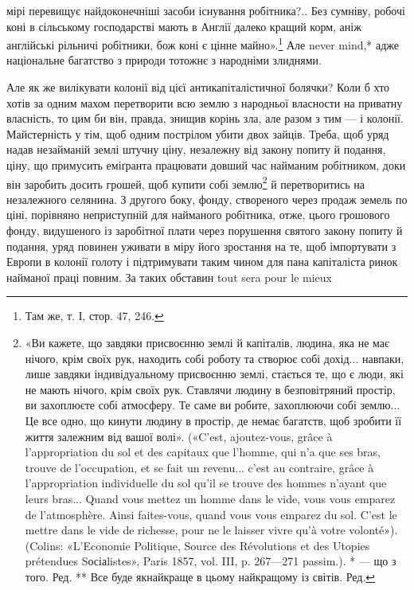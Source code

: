 \parcont{}  %
мірі перевищує найдоконечніші засоби існування робітника?.. Без сумніву, робочі коні в сільському
господарстві мають в Англії далеко кращий корм, аніж англійські рільничі робітники, бож коні є цінне
майно».\footnote{
Там же, т. І, стор. 47, 246.
} Але never mind,* адже національне багатство з природи тотожнє з народніми злиднями.

Але як же вилікувати колонії від цієї антикапіталістичної болячки? Коли б хто хотів за одним махом
перетворити всю землю з народньої власности на приватну власність, то цим би він, правда, знищив
корінь зла, але разом з тим — і колонії. Майстерність у тім, щоб одним пострілом убити двох зайців.
Треба, щоб уряд надав незайманій землі штучну ціну, незалежну від закону попиту й подання, ціну, що
примусить еміґранта
працювати довший час найманим робітником, доки він заробить досить грошей, щоб купити собі землю\footnote{
«Ви кажете, що завдяки присвоєнню землі й капіталів, людина, яка не має нічого, крім своїх рук,
находить собі роботу та створює собі дохід... навпаки, лише завдяки індивідуальному присвоєнню
землі, стається те, що є люди, які не мають нічого, крім своїх рук. Ставлячи людину в безповітряний
простір, ви захоплюєте собі атмосферу. Те саме ви робите, захоплюючи собі землю... Це все одно, що
кинути людину в простір, де немає багатств, щоб зробити її життя залежним від вашої волі». («C’est,
ajoutez-vous, grâce à l’appropriation du sol et des capitaux que l’homme, qui n’a que ses bras,
trouve de l’occupation, et se fait un revenu... c’est au contraire, grâce à l’appropriation
individuelle du
sol qu’il se trouve des hommes n’ayant que leurs bras... Quand vous mettez un homme dans le vide,
vous vous emparez de l’atmosphère. Ainsi faites-vous, quand vous vous emparez du sol. C’est le
mettre dans le vide de richesse, pour ne le laisser vivre qu’à votre volonté»). (Colins: «L’Economie
Politique, Source des Révolutions et des Utopies prétendues Sосіаlistes», Paris 1857, vol. III, p.
267—271 passim.).
* — що з того. Ред.
** Все буде якнайкраще в цьому найкращому із світів. Ред.
}
й перетворитись на незалежного селянина. З другого боку, фонду, створеного через продаж земель по
ціні, порівняно неприступній для найманого робітника, отже, цього грошового фонду, видушеного із
заробітної плати через порушення святого закону попиту й подання, уряд повинен уживати в міру його
зростання на те, щоб імпортувати з Европи в колонії голоту і підтримувати таким
чином для пана капіталіста ринок найманої праці повним. За таких обставин tout sera pour le mieux
